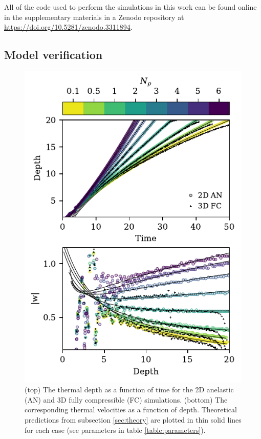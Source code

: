 All of the code used to perform the simulations in this work can be found online in the supplementary materials in a Zenodo repository \citep{supp_andersetall2019b} at \url{https://doi.org/10.5281/zenodo.3311894}.


\subsection{Model verification}
\label{sec:results}
\begin{figure}[p!]
	\begin{center}
    \includegraphics[width=0.9\columnwidth]{./figs/results_panels.pdf}
	\end{center}
    \caption[Depth and radius evolution of thermals at varying stratifications.]
	{
	(top) The thermal depth as a function of time for the 2D anelastic (AN) and 3D fully compressible (FC) simulations.
	(bottom) The corresponding thermal velocities as a function of depth.
	Theoretical predictions from subsection \ref{sec:theory} are plotted in thin solid lines for each case (see parameters in table \ref{table:parameters}).
    \label{fig:results_panels} }
\end{figure}


